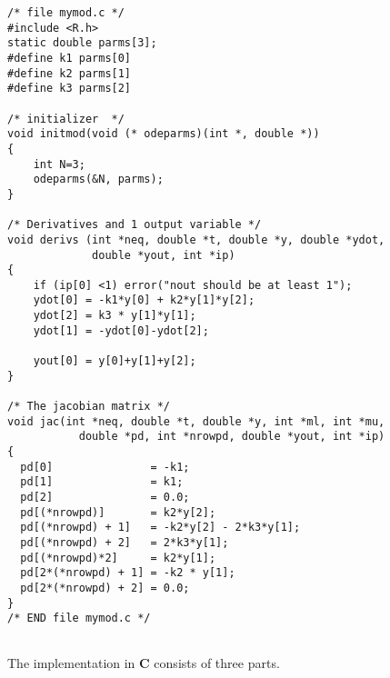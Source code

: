 \documentclass[english]{article}
\newcommand{\C}{\textbf{\textsf{C}}\xspace}
\begin{document}
\begin{verbatim}
/* file mymod.c */ 
#include <R.h>
static double parms[3];
#define k1 parms[0] 
#define k2 parms[1] 
#define k3 parms[2]

/* initializer  */ 
void initmod(void (* odeparms)(int *, double *)) 
{
    int N=3;
    odeparms(&N, parms);
}

/* Derivatives and 1 output variable */ 
void derivs (int *neq, double *t, double *y, double *ydot,
             double *yout, int *ip)
{
    if (ip[0] <1) error("nout should be at least 1");
    ydot[0] = -k1*y[0] + k2*y[1]*y[2];
    ydot[2] = k3 * y[1]*y[1];
    ydot[1] = -ydot[0]-ydot[2];

    yout[0] = y[0]+y[1]+y[2];
} 

/* The jacobian matrix */ 
void jac(int *neq, double *t, double *y, int *ml, int *mu, 
           double *pd, int *nrowpd, double *yout, int *ip)
{
  pd[0]               = -k1;
  pd[1]               = k1;
  pd[2]               = 0.0;
  pd[(*nrowpd)]       = k2*y[2];
  pd[(*nrowpd) + 1]   = -k2*y[2] - 2*k3*y[1];
  pd[(*nrowpd) + 2]   = 2*k3*y[1];
  pd[(*nrowpd)*2]     = k2*y[1];
  pd[2*(*nrowpd) + 1] = -k2 * y[1];
  pd[2*(*nrowpd) + 2] = 0.0;
}
/* END file mymod.c */


\end{verbatim}
The implementation in \C consists of three parts.
\end{document}
